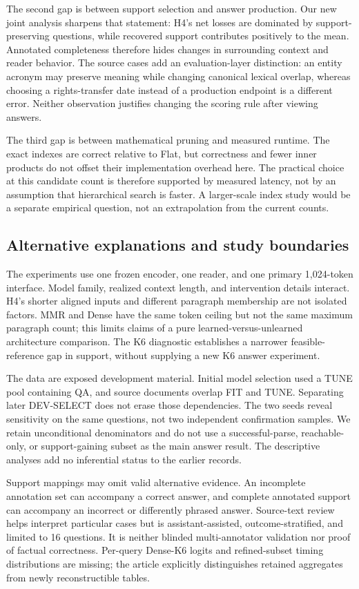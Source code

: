 \documentclass[preprint,12pt]{elsarticle}
\begin{document}
The second gap is between support selection and answer production. Our new joint analysis sharpens that statement: H4's net losses are dominated by support-preserving questions, while recovered support contributes positively to the mean. Annotated completeness therefore hides changes in surrounding context and reader behavior. The source cases add an evaluation-layer distinction: an entity acronym may preserve meaning while changing canonical lexical overlap, whereas choosing a rights-transfer date instead of a production endpoint is a different error. Neither observation justifies changing the scoring rule after viewing answers.

The third gap is between mathematical pruning and measured runtime. The exact indexes are correct relative to Flat, but correctness and fewer inner products do not offset their implementation overhead here. The practical choice at this candidate count is therefore supported by measured latency, not by an assumption that hierarchical search is faster. A larger-scale index study would be a separate empirical question, not an extrapolation from the current counts.

\subsection{Alternative explanations and study boundaries}
The experiments use one frozen encoder, one reader, and one primary 1,024-token interface. Model family, realized context length, and intervention details interact. H4's shorter aligned inputs and different paragraph membership are not isolated factors. MMR and Dense have the same token ceiling but not the same maximum paragraph count; this limits claims of a pure learned-versus-unlearned architecture comparison. The K6 diagnostic establishes a narrower feasible-reference gap in support, without supplying a new K6 answer experiment.

The data are exposed development material. Initial model selection used a TUNE pool containing QA, and source documents overlap FIT and TUNE. Separating later DEV-SELECT does not erase those dependencies. The two seeds reveal sensitivity on the same questions, not two independent confirmation samples. We retain unconditional denominators and do not use a successful-parse, reachable-only, or support-gaining subset as the main answer result. The descriptive analyses add no inferential status to the earlier records.

Support mappings may omit valid alternative evidence. An incomplete annotation set can accompany a correct answer, and complete annotated support can accompany an incorrect or differently phrased answer. Source-text review helps interpret particular cases but is assistant-assisted, outcome-stratified, and limited to 16 questions. It is neither blinded multi-annotator validation nor proof of factual correctness. Per-query Dense-K6 logits and refined-subset timing distributions are missing; the article explicitly distinguishes retained aggregates from newly reconstructible tables.
\end{document}
